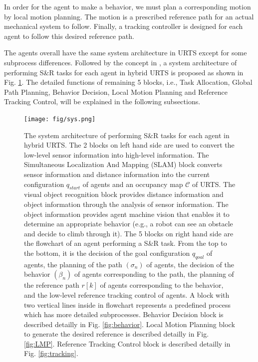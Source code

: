 \documentclass{ieeeaccess}
\begin{document}
In order for the agent to make a behavior, we must plan a corresponding motion by local motion planning. The motion is a prescribed reference path for an actual mechanical system to follow. Finally, a tracking controller is designed for each agent to follow this desired reference path.

The agents overall have the same system architecture in URTS except for some subprocess differences. Followed by the concept in \cite{paden2016survey}, a system architecture of performing S\&R tasks for each agent in hybrid URTS is proposed as shown in Fig. \ref{fig:sys}.  The detailed functions of remaining 5 blocks, i.e., Task Allocation, Global Path Planning, Behavior Decision, Local Motion Planning and Reference Tracking Control, will be explained in the following subsections.


\begin{figure}[htbp]
    \centering
    \texttt{[image: fig/sys.png]}\caption{The system architecture of performing S\&R tasks for each agent in hybrid URTS. The 2 blocks on left hand side are used to convert the low-level sensor information into high-level information. The Simultaneous Localization And Mapping (SLAM) block converts sensor information and distance information into the current configuration $q_{start}$ of agents and an occupancy map $\mathcal{C}$ of URTS. The visual object recognition block provides distance information and object information through the analysis of sensor information. The object information provides agent machine vision that enables it to determine an appropriate behavior (e.g., a robot can see an obstacle and decide to climb through it). The 5 blocks on right hand side are the flowchart of an agent performing a S\&R task. From the top to the bottom, it is the decision of the goal configuration $q_{qoal}$ of agents, the planning of the path $(\sigma_n)$ of agents, the decision of the behavior $(\beta_n)$ of agents corresponding to the path, the planning of the reference path $r[k]$ of agents corresponding to the behavior, and the low-level reference tracking control of agents. A block with two vertical lines inside in flowchart represents a predefined process which has more detailed subprocesses. Behavior Decision block is described detailly in Fig. \ref{fig:behavior}. Local Motion Planning block to generate the desired reference is described detailly in Fig. \ref{fig:LMP}. Reference Tracking Control block is described detailly in Fig. \ref{fig:tracking}.}
    \label{fig:sys}
\end{figure}
\end{document}
